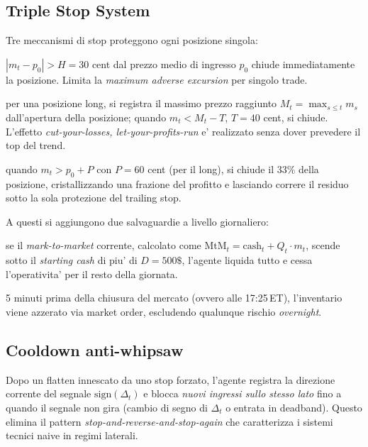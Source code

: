 \documentclass[11pt,a4paper]{article}
\begin{document}
\subsection{Triple Stop System}

Tre meccanismi di stop proteggono ogni posizione singola:

\begin{description}[leftmargin=1.4em]
    \item[Hard stop:] $|m_t - p_0| > H = 30$ cent dal prezzo medio di
          ingresso $p_0$ chiude immediatamente la posizione. Limita
          la \emph{maximum adverse excursion} per singolo trade.
    \item[Trailing stop (Chandelier exit):] per una posizione long,
          si registra il massimo prezzo raggiunto $M_t = \max_{s \le t} m_s$
          dall'apertura della posizione; quando
          $m_t < M_t - T$, $T = 40$ cent, si chiude. L'effetto
          \emph{cut-your-losses, let-your-profits-run} e' realizzato
          senza dover prevedere il top del trend.
    \item[Partial take-profit:] quando $m_t > p_0 + P$ con
          $P = 60$ cent (per il long), si chiude il 33\% della
          posizione, cristallizzando una frazione del profitto e
          lasciando correre il residuo sotto la sola protezione del
          trailing stop.
\end{description}

A questi si aggiungono due salvaguardie a livello giornaliero:
\begin{description}[leftmargin=1.4em]
    \item[Daily stop M2M:] se il \emph{mark-to-market} corrente,
          calcolato come $\text{MtM}_t = \text{cash}_t + Q_t \cdot m_t$,
          scende sotto il \emph{starting cash} di piu' di
          $D = 500\$$, l'agente liquida tutto e cessa l'operativita'
          per il resto della giornata.
    \item[EOD flatten:] 5 minuti prima della chiusura del mercato
          (ovvero alle 17:25\,ET), l'inventario viene azzerato via
          market order, escludendo qualunque rischio \emph{overnight}.
\end{description}

\subsection{Cooldown anti-whipsaw}

Dopo un flatten innescato da uno stop forzato, l'agente registra la
direzione corrente del segnale $\text{sign}(\Delta_t)$ e blocca
\emph{nuovi ingressi sullo stesso lato} fino a quando il segnale non
gira (cambio di segno di $\Delta_t$ o entrata in deadband).  Questo
elimina il pattern \emph{stop-and-reverse-and-stop-again} che
caratterizza i sistemi tecnici naive in regimi laterali.
\end{document}
